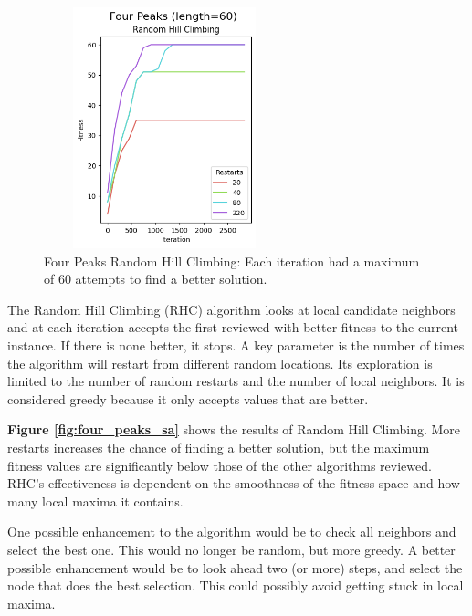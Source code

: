 \documentclass[letterpaper]{article} %
\begin{document}
\begin{figure}[!htb]
\centering
\includegraphics[width=2.75in, height=2.75in]{figures/Four_Peaks_length=60_Random_Hill_Climbing_l_60_ma_120_r_20__40__80__320_.png}
\caption{Four Peaks Random Hill Climbing: Each iteration had a maximum of 60 attempts to find a better solution. }
\label{fig:four_peaks_rhc}
\end{figure}

The Random Hill Climbing (RHC) algorithm looks at local candidate neighbors and at each iteration accepts the first reviewed with better fitness to the current instance.  If there is none better, it stops.   A key parameter is the number of times the algorithm will restart from different random locations.   Its exploration is limited to the number of random restarts and the number of local neighbors.  It is considered greedy because it only accepts values that are better.

\textbf{Figure \ref{fig:four_peaks_sa}}  shows the results of Random Hill Climbing.  More restarts increases the chance of finding a better solution, but the maximum fitness values are significantly below those of the other algorithms reviewed. RHC's effectiveness is dependent on the smoothness of the fitness space and how many local maxima it contains.

One possible enhancement to the algorithm would be to check all neighbors and select the best one.  This would no longer be random, but more greedy.  A better possible enhancement would be to look ahead two (or more) steps, and select the node that does the best selection.  This could possibly avoid getting stuck in local maxima.
\end{document}
